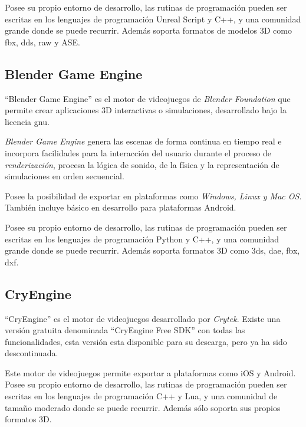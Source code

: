 Posee su propio entorno de desarrollo, las rutinas de programación pueden ser escritas 
en los lenguajes de programación Unreal Script y C++, y una comunidad 
grande donde se puede recurrir. Además soporta formatos de modelos 
3D como fbx, dds, raw y ASE\cite{unrealengine}.

\subsection{Blender Game Engine}

\enquote{Blender Game Engine} es el motor de videojuegos de \textit{Blender Foundation} 
que permite crear aplicaciones 3D interactivas o simulaciones, desarrollado bajo 
la licencia \Gls{gnu}\cite{blender}.

\textit{Blender Game Engine} genera las escenas de forma continua en tiempo real
e incorpora facilidades para la interacción del usuario durante el proceso de
\textit{renderización}, procesa la lógica de sonido, de la física y la 
representación de simulaciones en orden secuencial\cite{blender}.

Posee la posibilidad de exportar en plataformas como
\textit{Windows, Linux y Mac OS}. También incluye básico en desarrollo para 
plataformas Android\cite{blender}.

Posee su propio entorno de desarrollo, las rutinas de programación pueden ser 
escritas en los lenguajes de programación Python y C++, y
una comunidad grande donde se puede recurrir. Además soporta formatos 3D 
como 3ds, dae, fbx, dxf\cite{blender}.

\subsection{CryEngine}

\enquote{CryEngine} es el motor de videojuegos desarrollado por \textit{Crytek}.
Existe una versión gratuita denominada \enquote{CryEngine Free SDK} con todas
las funcionalidades, esta versión esta disponible para su descarga, pero ya ha
sido descontinuada\cite{cryengine:sdk}.

Este motor de videojuegos permite exportar a plataformas como iOS y
Android\cite{cryengine}. Posee su propio entorno de desarrollo, las rutinas de
programación pueden ser escritas en los lenguajes de programación C++ y Lua, y
una comunidad de tamaño moderado donde se puede recurrir. Además sólo soporta
sus propios formatos 3D\cite{cryengine}.

